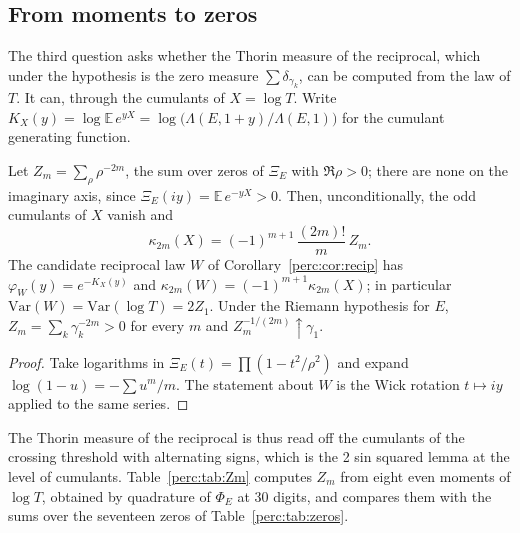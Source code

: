 \subsection{From moments to zeros}\label{perc:sec:cum}

The third question asks whether the Thorin measure of the reciprocal, which under the hypothesis is the zero measure $\sum\delta_{\gamma_k}$, can be computed from the law of $T$. It can, through the cumulants of $X = \log T$. Write $K_X(y) = \log\mathbb{E}\,e^{yX} = \log\big(\Lambda(E,1+y)/\Lambda(E,1)\big)$ for the cumulant generating function.

\begin{proposition}\label{perc:prop:cum}
Let $Z_m = \sum_\rho\rho^{-2m}$, the sum over zeros of $\Xi_E$ with $\Re\rho>0$; there are none on the imaginary axis, since $\Xi_E(iy) = \mathbb{E}\,e^{-yX}>0$. Then, unconditionally, the odd cumulants of $X$ vanish and
\[
\kappa_{2m}(X) = (-1)^{m+1}\,\frac{(2m)!}{m}\,Z_m.
\]
The candidate reciprocal law $W$ of Corollary~\ref{perc:cor:recip} has $\varphi_W(y) = e^{-K_X(y)}$ and $\kappa_{2m}(W) = (-1)^{m+1}\kappa_{2m}(X)$; in particular $\mathrm{Var}(W) = \mathrm{Var}(\log T) = 2Z_1$. Under the Riemann hypothesis for $E$, $Z_m = \sum_k\gamma_k^{-2m}>0$ for every $m$ and $Z_m^{-1/(2m)}\uparrow\gamma_1$.
\end{proposition}
\begin{proof}
Take logarithms in $\Xi_E(t) = \prod(1-t^2/\rho^2)$ and expand $\log(1-u) = -\sum u^m/m$. The statement about $W$ is the Wick rotation $t\mapsto iy$ applied to the same series.
\end{proof}

The Thorin measure of the reciprocal is thus read off the cumulants of the crossing threshold with alternating signs, which is the 2 sin squared lemma at the level of cumulants. Table~\ref{perc:tab:Zm} computes $Z_m$ from eight even moments of $\log T$, obtained by quadrature of $\Phi_E$ at 30 digits, and compares them with the sums over the seventeen zeros of Table~\ref{perc:tab:zeros}.

